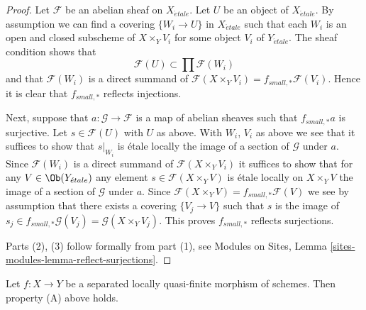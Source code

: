 \begin{proof}
Let $\mathcal{F}$ be an abelian sheaf on $X_{\acute{e}tale}$.
Let $U$ be an object of $X_{\acute{e}tale}$. By assumption we can find a
covering $\{W_i \to U\}$ in $X_{\acute{e}tale}$ such that each $W_i$ is
an open and closed subscheme of $X \times_Y V_i$ for some object
$V_i$ of $Y_{\acute{e}tale}$. The sheaf condition shows that
$$
\mathcal{F}(U) \subset \prod \mathcal{F}(W_i)
$$
and that $\mathcal{F}(W_i)$ is a direct summand of
$\mathcal{F}(X \times_Y V_i) = f_{small, *}\mathcal{F}(V_i)$.
Hence it is clear that $f_{small, *}$ reflects injections.

\medskip\noindent
Next, suppose that $a : \mathcal{G} \to \mathcal{F}$ is a map of
abelian sheaves such that $f_{small, *}a$ is surjective. Let
$s \in \mathcal{F}(U)$ with $U$ as above. With $W_i$, $V_i$ as
above we see that it suffices to show that $s|_{W_i}$ is \'etale locally
the image of a section of $\mathcal{G}$ under $a$. Since $\mathcal{F}(W_i)$
is a direct summand of $\mathcal{F}(X \times_Y V_i)$
it suffices to show that for any $V \in \Ob(Y_{\acute{e}tale})$
any element $s \in \mathcal{F}(X \times_Y V)$
is \'etale locally on $X \times_Y V$ the image of a section of
$\mathcal{G}$ under $a$. Since
$\mathcal{F}(X \times_Y V) = f_{small, *}\mathcal{F}(V)$
we see by assumption that there exists a covering $\{V_j \to V\}$ such that
$s$ is the image of
$s_j \in f_{small, *}\mathcal{G}(V_j) = \mathcal{G}(X \times_Y V_j)$.
This proves $f_{small, *}$ reflects surjections.

\medskip\noindent
Parts (2), (3) follow formally from part (1), see
Modules on Sites, Lemma \ref{sites-modules-lemma-reflect-surjections}.
\end{proof}

\begin{lemma}
\label{lemma-locally-quasi-finite-A}
Let $f : X \to Y$ be a separated locally quasi-finite morphism of schemes.
Then property (A) above holds.
\end{lemma}


